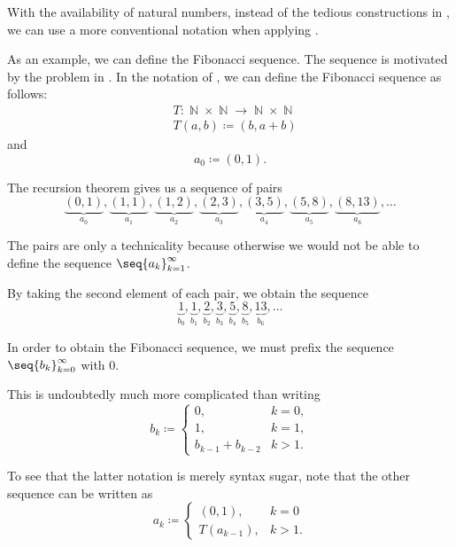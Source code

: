 \begin{remark}\label{rem:natural_number_recursion}
  With the availability of natural numbers, instead of the tedious constructions in , we can use a more conventional notation when applying .

  As an example, we can define the Fibonacci sequence. The sequence is motivated by the problem in . In the notation of , we can define the Fibonacci sequence as follows:
  \begin{equation*}
    \begin{aligned}
      &T: \BbbN \times \BbbN \to \BbbN \times \BbbN \\
      &T(a, b) \coloneqq (b, a + b)
    \end{aligned}
  \end{equation*}
  and
  \begin{equation*}
    a_0 \coloneqq (0, 1).
  \end{equation*}

  The recursion theorem gives us a sequence of pairs
  \begin{equation*}
    \underbrace{(0, 1)}_{a_0}, \underbrace{(1, 1)}_{a_1}, \underbrace{(1, 2)}_{a_2}, \underbrace{(2, 3)}_{a_3}, \underbrace{(3, 5)}_{a_4}, \underbrace{(5, 8)}_{a_5}, \underbrace{(8, 13)}_{a_6}, \ldots
  \end{equation*}

  The pairs are only a technicality because otherwise we would not be able to define the sequence \( \seq{ a_k }_{k=1}^\infty \).

  By taking the second element of each pair, we obtain the sequence
  \begin{equation*}
    \underbrace{1}_{b_0}, \underbrace{1}_{b_1}, \underbrace{2}_{b_2}, \underbrace{3}_{b_3}, \underbrace{5}_{b_4}, \underbrace{8}_{b_5}, \underbrace{13}_{b_6}, \ldots
  \end{equation*}

  In order to obtain the Fibonacci sequence, we must prefix the sequence \( \seq{ b_k }_{k=0}^\infty \) with \( 0 \).

  This is undoubtedly much more complicated than writing
  \begin{equation*}
    b_k \coloneqq \begin{cases}
      0,                &k = 0, \\
      1,                &k = 1, \\
      b_{k-1} + b_{k-2} &k > 1.
    \end{cases}
  \end{equation*}

  To see that the latter notation is merely syntax sugar, note that the other sequence can be written as
  \begin{equation*}
    a_k \coloneqq \begin{cases}
      (0, 1),     &k = 0 \\
      T(a_{k-1}), &k > 1.
    \end{cases}
  \end{equation*}
\end{remark}
